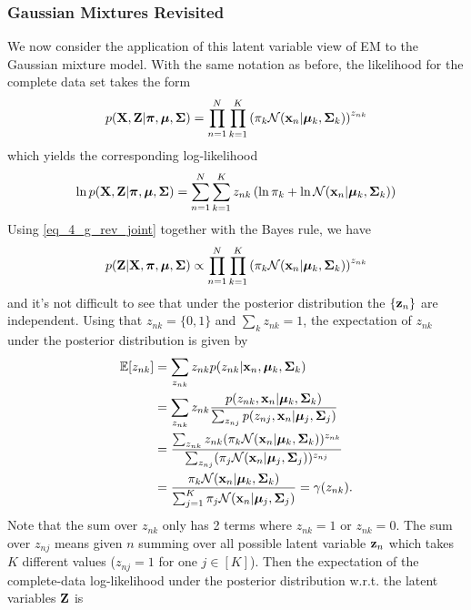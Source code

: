 \documentclass[../book-template.tex]{subfiles}
\begin{document}
\subsubsection{Gaussian Mixtures Revisited}
We now consider the application of this latent variable view of EM to the Gaussian mixture model. With the same notation as before, the likelihood for the complete data set takes the form
\begin{equation}\label{eq_4_g_rev_joint}
	p({\bf X,Z}|\bm{\pi},\bm{\mu},{\bf \Sigma}) = \prod_{n=1}^{N}\prod_{k=1}^{K} \left(\pi_k \mathcal{N}({\bf x}_n|\bm{\mu}_k,{\bf \Sigma}_k)\right)^{z_{nk}}
\end{equation}
which yields the corresponding log-likelihood
\begin{equation*}
	\ln p({\bf X,Z}|\bm{\pi},\bm{\mu},{\bf \Sigma}) = \sum_{n=1}^{N}\sum_{k=1}^{K} z_{nk}\left(\ln \pi_k +\ln \mathcal{N}({\bf x}_n|\bm{\mu}_k,{\bf \Sigma}_k)\right)
\end{equation*}
Using \eqref{eq_4_g_rev_joint} together with the Bayes rule, we have
\begin{equation*}
	p({\bf Z}|{\bf X}, \bm{\pi},\bm{\mu},{\bf \Sigma}) \propto  \prod_{n=1}^{N}\prod_{k=1}^{K} \left(\pi_k \mathcal{N}({\bf x}_n|\bm{\mu}_k,{\bf \Sigma}_k)\right)^{z_{nk}}
\end{equation*}
and it's not difficult to see that under the posterior distribution the $\{{\bf z}_n\}$ are independent. Using that $z_{nk}=\{0,1\}$ and $\sum_k z_{nk}=1$, the expectation of $z_{nk}$ under the posterior distribution is given by
\begin{align*}
	\mathbb{E}[z_{nk}] &= \sum_{z_{nk}}z_{nk}p(z_{nk}|{\bf x}_n, \bm{\mu}_k, {\bf \Sigma}_k)\\
	&= \sum_{z_{nk}}z_{nk} \frac{p(z_{nk},{\bf x}_n|\bm{\mu}_k, {\bf \Sigma}_k)}{\sum_{z_{nj}}p(z_{nj},{\bf x}_n|\bm{\mu}_j, {\bf \Sigma}_j)}\\
	&= \frac{\sum_{z_{nk}}z_{nk}(\pi_k \mathcal{N}({\bf x}_n|\bm{\mu}_k,{\bf \Sigma}_k))^{z_{nk}}}{\sum_{z_{nj}}(\pi_j \mathcal{N}({\bf x}_n|\bm{\mu}_j,{\bf \Sigma}_j))^{z_{nj}}}\\
	&= \frac{\pi_k \mathcal{N}({\bf x}_n|\bm{\mu}_k,{\bf \Sigma}_k)}{\sum_{j=1}^{K}\pi_j \mathcal{N}({\bf x}_n|\bm{\mu}_j,{\bf \Sigma}_j)} = \gamma(z_{nk}).
\end{align*}
Note that the sum over $z_{nk}$ only has 2 terms where $z_{nk}=1$ or $z_{nk}=0$. The sum over $z_{nj}$ means given $n$ summing over all possible latent variable ${\bf z}_n$ which takes $K$ different values ($z_{nj}=1$ for one $j \in [K] $). Then the expectation of the complete-data log-likelihood under the posterior distribution w.r.t. the latent variables ${\bf Z}$ is
\end{document}

